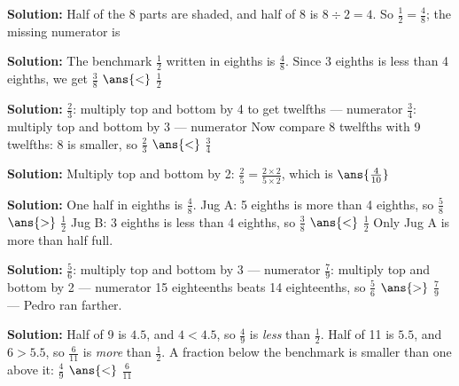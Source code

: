 \documentclass[12pt]{article}
\begin{document}



\textbf{Solution:} Half of the 8 parts are shaded, and half of 8 is
$8 \div 2 = 4$. So $\tfrac{1}{2} = \tfrac{4}{8}$; the missing numerator is


\textbf{Solution:} The benchmark $\tfrac{1}{2}$ written in eighths is
$\tfrac{4}{8}$. Since 3 eighths is less than 4 eighths, we get
$\tfrac{3}{8}$ $\ans{<}$ $\tfrac{1}{2}$


\textbf{Solution:} $\tfrac{2}{3}$: multiply top and bottom by 4 to get
twelfths --- numerator 
$\tfrac{3}{4}$: multiply top and bottom by 3 --- numerator 
Now compare 8 twelfths with 9 twelfths: 8 is smaller, so
$\tfrac{2}{3}$ $\ans{<}$ $\tfrac{3}{4}$


\textbf{Solution:} Multiply top and bottom by 2:
$\tfrac{2}{5} = \tfrac{2 \times 2}{5 \times 2}$, which is
$\ans{\tfrac{4}{10}}$


\textbf{Solution:} One half in eighths is $\tfrac{4}{8}$.
Jug A: 5 eighths is more than 4 eighths, so
$\tfrac{5}{8}$ $\ans{>}$ $\tfrac{1}{2}$
Jug B: 3 eighths is less than 4 eighths, so
$\tfrac{3}{8}$ $\ans{<}$ $\tfrac{1}{2}$
Only Jug A is more than half full.


\textbf{Solution:} $\tfrac{5}{6}$: multiply top and bottom by 3 --- numerator
$\tfrac{7}{9}$: multiply top and bottom by 2 --- numerator 
15 eighteenths beats 14 eighteenths, so
$\tfrac{5}{6}$ $\ans{>}$ $\tfrac{7}{9}$ --- Pedro ran farther.


\textbf{Solution:} Half of 9 is $4.5$, and $4 < 4.5$, so $\tfrac{4}{9}$ is
\emph{less} than $\tfrac{1}{2}$. Half of 11 is $5.5$, and $6 > 5.5$, so
$\tfrac{6}{11}$ is \emph{more} than $\tfrac{1}{2}$. A fraction below the
benchmark is smaller than one above it:
$\tfrac{4}{9}$ $\ans{<}$ $\tfrac{6}{11}$
\end{document}
